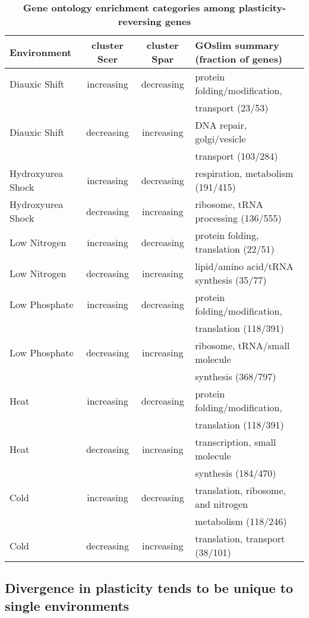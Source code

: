 \begin{table}[H]
\centering
\begin{tabular}{|l|c|c|l|}
\hline
{\bf Environment} & {\bf cluster Scer} & {\bf cluster Spar} & {\bf GOslim summary (fraction of genes)} \\ 
\hline
Diauxic Shift & increasing & decreasing & protein folding/modification, \\
&&& transport (23/53) \\ \hline
Diauxic Shift & decreasing & increasing & DNA repair, golgi/vesicle \\
&&& transport (103/284) \\ \hline
Hydroxyurea Shock & increasing & decreasing & respiration, metabolism (191/415) \\ \hline
Hydroxyurea Shock & decreasing & increasing & ribosome, tRNA processing (136/555) \\ \hline
Low Nitrogen & increasing & decreasing & protein folding, translation (22/51) \\ \hline
Low Nitrogen & decreasing & increasing & lipid/amino acid/tRNA synthesis (35/77) \\ \hline
Low Phosphate & increasing & decreasing & protein folding/modification,\\
&&& translation (118/391) \\ \hline
Low Phosphate & decreasing & increasing & ribosome, tRNA/small molecule \\
&&& synthesis (368/797) \\ \hline
Heat & increasing & decreasing & protein folding/modification, \\
&&& translation (118/391) \\ \hline
Heat & decreasing & increasing & transcription, small molecule \\
&&& synthesis (184/470) \\ \hline
Cold & increasing & decreasing & translation, ribosome, and nitrogen \\
&&& metabolism (118/246) \\ \hline
Cold & decreasing & increasing & translation, transport (38/101) \\ 
\hline
\end{tabular}
\caption{{\bf Gene ontology enrichment categories among plasticity-reversing genes}}
 \label{tableGO}
\end{table}

\subsection{Divergence in plasticity tends to be unique to single environments}

